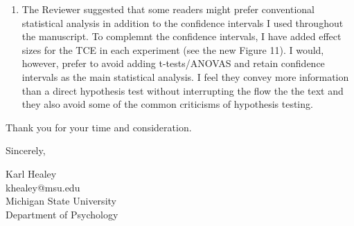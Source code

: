 \documentclass[12pt]{article}
\begin{document}
\begin{enumerate}
	\item
	The Reviewer suggested that some readers might prefer conventional statistical analysis in addition to the confidence intervals I used throughout the manuscript. To complemnt the confidence intervals, I have added effect sizes for the TCE in each experiment (see the new Figure 11). I would, however, prefer to avoid adding t-tests/ANOVAS and retain confidence intervals as the main statistical analysis. I feel they convey more information than a direct hypothesis test without interrupting the flow the the text and they also avoid some of the common criticisms of hypothesis testing. %
	

\end{enumerate}



\vspace{20pt}

Thank you for your time and consideration.

\vspace{10pt}

Sincerely,

\vspace{10pt}

Karl Healey\\
khealey@msu.edu\\
Michigan State University\\
Department of Psychology


\end{document}

